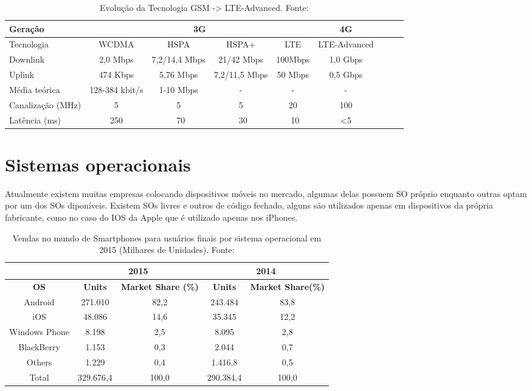 \begin{table}[!htb]
	\small
  	\centering
	\label{tab:LTE}
	\begin{tabular}{|l|*{8}{c|}}
		\hline \SPACE
		Geração & \multicolumn{4}{|c|}{3G}  & 4G\\ \hline \SPACE
		Tecnologia & WCDMA & HSPA & HSPA+ & LTE & LTE-Advanced\\ \hline \SPACE
		Downlink & 2,0 Mbps & 7,2/14,4 Mbps & 21/42 Mbps & 100Mbps & 1,0 Gbps\\ \hline \SPACE
		Uplink & 474 Kbps & 5,76 Mbps & 7,2/11,5 Mbps & 50 Mbps & 0,5 Gbps\\ \hline \SPACE
		Média teórica & 128-384 kbit/s & 1-10 Mbps & - & - & -\\ \hline \SPACE
		Canalização (MHz) & 5 & 5 & 5 & 20 & 100\\ \hline \SPACE
		Latência (ms) & 250 & ~70 & ~30 & ~10 & <5\\ \hline
	\end{tabular}
	\caption[Evolução da Tecnologia GSM -> LTE-Advanced]{Evolução da Tecnologia GSM -> LTE-Advanced. Fonte: \cite{4gamericas}}
\end{table}%

\section{Sistemas operacionais}
Atualmente existem muitas empresas colocando dispositivos móveis no mercado, algumas delas possuem SO próprio enquanto outras optam por um dos SOs diponíveis.
Existem SOs livres e outros de código fechado, alguns são utilizados apenas em dispositivos da própria fabricante, como no caso do IOS da Apple que é utilizado apenas nos iPhones.

\begin{table}[!htb]
	\small
	\centering
	\label{tab:OS}
	\begin{tabular}{|*5{c|}}
		\multicolumn{1}{c|}{} & \multicolumn{2}{c|}{\textbf{2015}} & \multicolumn{2}{|c|}{\textbf{2014}}\\ \hline
		\textbf{OS} & \textbf{Units}  & \textbf{Market Share (\%)} & \textbf{Units}  & \textbf{Market Share(\%)}\\ \hline \SPACE
		Android & 271.010 & 82,2 & 243.484 & 83,8\\ \hline \SPACE
		iOS & 48.086 & 14,6 & 35.345 & 12,2\\ \hline \SPACE
		Windows Phone & 8.198 & 2,5 & 8.095 & 2,8\\ \hline \SPACE
		BlackBerry & 1.153 & 0,3 & 2.044 & 0,7\\ \hline \SPACE
		Others & 1.229 & 0,4 & 1.416,8 & 0,5\\ \hline \SPACE
		Total & 329.676,4 & 100,0 & 290.384,4 & 100,0\\
		\hline
	\end{tabular}
	\caption[Sistemas operacionais mais utilizados]{Vendas no mundo de Smartphones para usuários finais por sistema operacional em 2015 (Milhares de Unidades). Fonte: \cite{gartner}}
\end{table}
\vspace{-7mm}

